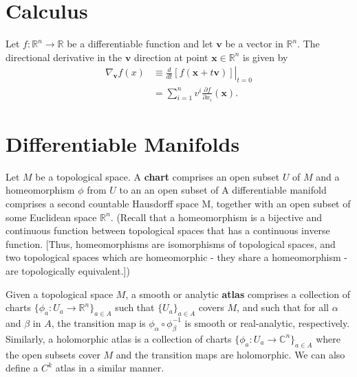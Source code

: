 \documentclass{book}
\begin{document}
	\chapter{Calculus}
		Let $f:\mathbb{R}^n\rightarrow\mathbb{R}$ be a differentiable function and let $\mathbf{v}$ be a vector in $\mathbb{R}^n$. The directional derivative in the $\mathbf{v}$ direction at point $\mathbf{x}\in\mathbb{R}^n$ is given by
		\begin{align}
			\nabla_\mathbf{v}f(x)&\equiv\left.\frac{d}{dt}[f(\mathbf{x}+t\mathbf{v})]\right\rvert_{t=0}\\
			&=\sum_{i=1}^{n}{v^i\frac{\partial f}{\partial x_i}(\mathbf{x})}\mathrm{.}
		\end{align}
		
	\chapter{Differentiable Manifolds}
	
		Let $M$ be a topological space. A \textbf{chart} comprises an open subset $U$ of $M$ and a homeomorphism $\phi$ from $U$ to an an open subset of  A differentiable manifold comprises a second countable Hausdorff space M, together with an open subset of some Euclidean space $\mathbb{R}^n$. (Recall that a homeomorphism is a bijective and continuous function between topological spaces that has a continuous inverse function. [Thus, homeomorphisms are isomorphisms of topological spaces, and two topological spaces which are homeomorphic - they share a homeomorphism - are topologically equivalent.])
		
		Given a topological space $M$, a smooth or analytic \textbf{atlas} comprises a collection of charts $\{\phi_a:U_a\rightarrow\mathbb{R}^n\}_{a\in A}$ such that $\{U_a\}_{a\in A}$ covers $M$, and such that for all $\alpha$ and $\beta$ in $A$, the transition map is $\phi_\alpha\circ\phi_\beta^{-1}$ is smooth or real-analytic, respectively. Similarly, a holomorphic atlas is a collection of charts $\{\phi_a:U_a\rightarrow\mathbb{C}^n\}_{a\in A}$ where the open subsets cover $M$ and the transition maps are holomorphic. We can also define a $C^k$ atlas in a similar manner.
		
\end{document}

